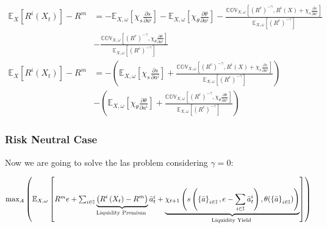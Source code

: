 \begin{align*}
\mathbb{E}_{X}\left[R^{i}\left(X_{t}\right)\right]-R^{m} & =-\mathbb{E}_{X,\omega}\left[\chi_{s}\frac{\partial s}{\partial a^{i}}\right]-\mathbb{E}_{X,\omega}\left[\chi_{\theta}\frac{\partial\theta}{\partial a^{i}}\right]-\frac{\mathbb{COV}_{X,\omega}\left[\left(R^{e}\right)^{-\gamma},R^{i}\left(X\right)+\chi_{s}\frac{\partial s}{\partial a^{i}}\right]}{\mathbb{E}_{X,\omega}\left[\left(R^{e}\right)^{-\gamma}\right]}\\
 & -\frac{\mathbb{COV}_{X,\omega}\left[\left(R^{e}\right)^{-\gamma},\chi_{\theta}\frac{\partial\theta}{\partial a^{i}}\right]}{\mathbb{E}_{X,\omega}\left[\left(R^{e}\right)^{-\gamma}\right]}\\
\mathbb{E}_{X}\left[R^{i}\left(X_{t}\right)\right]-R^{m} & =-\left(\mathbb{E}_{X,\omega}\left[\chi_{s}\frac{\partial s}{\partial a^{i}}\right]+\frac{\mathbb{COV}_{X,\omega}\left[\left(R^{e}\right)^{-\gamma},R^{i}\left(X\right)+\chi_{s}\frac{\partial s}{\partial a^{i}}\right]}{\mathbb{E}_{X,\omega}\left[\left(R^{e}\right)^{-\gamma}\right]}\right)\\
 & -\left(\mathbb{E}_{X,\omega}\left[\chi_{\theta}\frac{\partial\theta}{\partial a^{i}}\right]+\frac{\mathbb{COV}_{X,\omega}\left[\left(R^{e}\right)^{-\gamma},\chi_{\theta}\frac{\partial\theta}{\partial a^{i}}\right]}{\mathbb{E}_{X,\omega}\left[\left(R^{e}\right)^{-\gamma}\right]}\right)
\end{align*}


\subsubsection{Risk Neutral Case}

{\small Now we are going to solve the las problem considering $\gamma=0$:}{\small\par}
\begin{center}
{\small$\max_{A}\left(\mathbb{E}_{X,\omega}\left[R^{m}e+\sum_{i\in\mathbb{I}}\underbrace{\left(R^{i}\left(X_{t}\right)-R^{m}\right)}_{\text{Liquidity Premium }}\bar{a}_{t}^{i}+\text{\ensuremath{\underbrace{\chi_{t+1}\left(s\left(\left\{  \bar{a}\right\}  _{i\in\mathbb{I}},e-\sum_{i\in\mathbb{I}}\bar{a}{}_{t}^{i}\right),\theta(\left\{  \bar{a}\right\}  _{i\in\mathbb{I}})\right)}_{\text{Liquidity Yield }}}}\right]\right)$}{\small\par}
\par\end{center}

